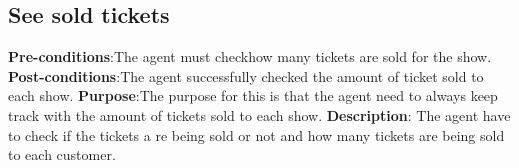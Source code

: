 \subsection{See sold tickets}
\textbf{Pre-conditions}:The agent must checkhow many tickets are sold for the show.
\textbf{Post-conditions}:The agent successfully checked the amount of ticket sold to each show.
\textbf{Purpose}:The purpose for this is that the agent need to always keep track with the amount of tickets sold to each show.
\textbf{Description}: The agent have to check if the tickets a re being sold or not and how many tickets are being sold to each customer.
